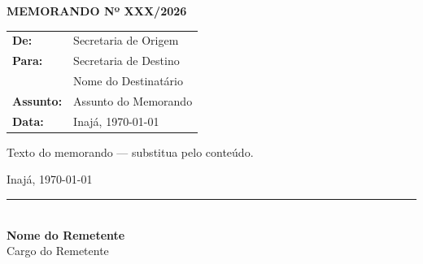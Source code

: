 \documentclass[12pt,a4paper]{article}
\newcommand{\municipio}{Inajá}
\newcommand{\numeroMemorando}{XXX/2026}
\newcommand{\localData}{\municipio, \today}
\newcommand{\deSetor}{Secretaria de Origem}
\newcommand{\paraSetor}{Secretaria de Destino}
\newcommand{\paraResponsavel}{Nome do Destinatário}
\newcommand{\assuntoMemorando}{Assunto do Memorando}
\newcommand{\textoMemorando}{Texto do memorando — substitua pelo conteúdo.}
\newcommand{\remetenteNome}{Nome do Remetente}
\newcommand{\remetenteCargo}{Cargo do Remetente}
\begin{document}
\begin{center}
  \Large\textbf{MEMORANDO Nº \numeroMemorando}
\end{center}

\vspace{0.8cm}

\begin{tabular}{@{}ll}
  \textbf{De:} & \deSetor \\
  \textbf{Para:} & \paraSetor \\
              & \paraResponsavel \\
  \textbf{Assunto:} & \assuntoMemorando \\
  \textbf{Data:} & \localData \\
\end{tabular}

\vspace{0.8cm}

\noindent
\textoMemorando

\vspace{1.5cm}

\begin{flushright}
  \localData
\end{flushright}

\vspace{1cm}

\begin{center}
  \rule{6cm}{0.4pt} \\
  \textbf{\remetenteNome} \\
  \remetenteCargo
\end{center}
\end{document}
